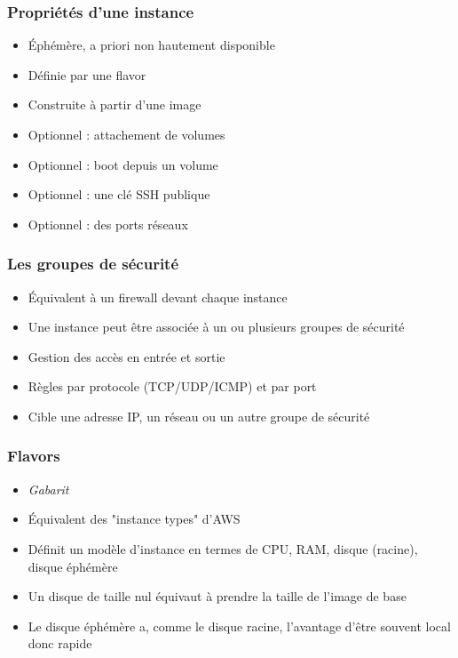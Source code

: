   \begin{frame}
    \frametitle{Propriétés d'une instance}
    \begin{itemize}
      \item Éphémère, a priori non hautement disponible
      \item Définie par une flavor
      \item Construite à partir d'une image
      \item Optionnel : attachement de volumes
      \item Optionnel : boot depuis un volume
      \item Optionnel : une clé SSH publique
      \item Optionnel : des ports réseaux
    \end{itemize}
  \end{frame}

  \begin{frame}
    \frametitle{Les groupes de sécurité}
    \begin{itemize}
      \item Équivalent à un firewall devant chaque instance
      \item Une instance peut être associée à un ou plusieurs groupes de sécurité
      \item Gestion des accès en entrée et sortie
      \item Règles par protocole (TCP/UDP/ICMP) et par port
      \item Cible une adresse IP, un réseau ou un autre groupe de sécurité
    \end{itemize}
  \end{frame}

  \begin{frame}
    \frametitle{Flavors}
    \begin{itemize}
      \item \textit{Gabarit}
      \item Équivalent des "instance types" d'AWS
      \item Définit un modèle d'instance en termes de CPU, RAM, disque (racine), disque éphémère
      \item Un disque de taille nul équivaut à prendre la taille de l'image de base
      \item Le disque éphémère a, comme le disque racine, l'avantage d'être souvent local donc rapide
    \end{itemize}
  \end{frame}

